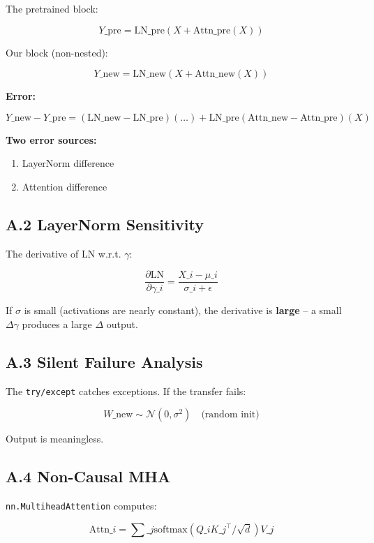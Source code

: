 The pretrained block:

\[
Y\_\text{pre} = \text{LN}\_\text{pre}(X + \text{Attn}\_\text{pre}(X))
\tag{A.1}
\]

Our block (non-nested):

\[
Y\_\text{new} = \text{LN}\_\text{new}(X + \text{Attn}\_\text{new}(X))
\tag{A.2}
\]

\textbf{Error:}

\[
Y\_\text{new} - Y\_\text{pre} = (\text{LN}\_\text{new} - \text{LN}\_\text{pre})(\dots) + \text{LN}\_\text{pre}(\text{Attn}\_\text{new} - \text{Attn}\_\text{pre})(X)
\tag{A.3}
\]

\textbf{Two error sources:}
\begin{enumerate}
\item LayerNorm difference
\item Attention difference

\end{enumerate}
\subsection{A.2 LayerNorm Sensitivity}

The derivative of LN w.r.t. $\gamma$:

\[
\frac{\partial \text{LN}}{\partial \gamma\_i} = \frac{X\_i - \mu\_i}{\sigma\_i + \epsilon}
\tag{A.4}
\]

If $\sigma$ is small (activations are nearly constant), the derivative is 
\textbf{large} -- a small $\Delta \gamma$ produces a large $\Delta$ output.

\subsection{A.3 Silent Failure Analysis}

The \texttt{try/except} catches exceptions. If the transfer fails:

\[
W\_\text{new} \sim \mathcal{N}(0, \sigma^2) \quad \text{(random init)}
\tag{A.5}
\]

Output is meaningless.

\subsection{A.4 Non-Causal MHA}

\texttt{nn.MultiheadAttention} computes:

\[
\text{Attn}\_i = \sum\_j \text{softmax}(Q\_i K\_j^\top / \sqrt{d}) V\_j
\tag{A.6}
\]

